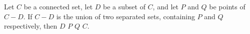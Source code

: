 Let $C$ be a connected set, let $D$ be a subset of $C$, and let $P$ and $Q$ be points of $C - D$. If $C - D$ is the union of two separated sets, containing $P$ and $Q$ respectively, then $D$  $P$  $Q$  $C$.
